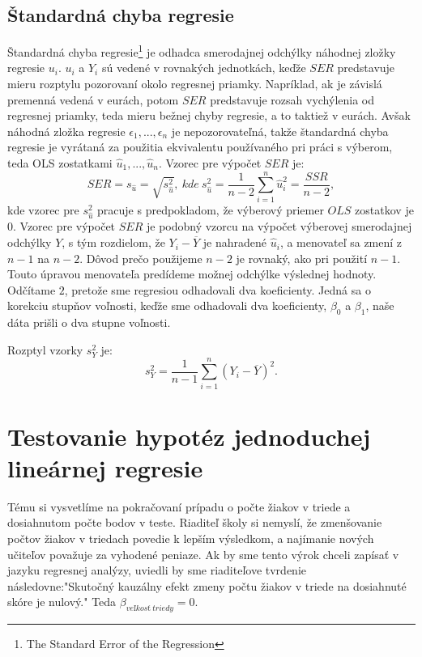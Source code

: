 \documentclass[]{tukediphc}
\begin{document}
\subsection{Štandardná chyba regresie}

Štandardná chyba regresie\footnote{The Standard Error of the Regression} je odhadca smerodajnej odchýlky náhodnej zložky regresie $u_i$. $u_i$ a $Y_i$ sú vedené v rovnakých jednotkách, keďže $SER$ predstavuje mieru rozptylu pozorovaní okolo regresnej priamky. Napríklad, ak je závislá premenná vedená v eurách, potom $SER$ predstavuje rozsah vychýlenia od regresnej priamky, teda mieru bežnej chyby regresie, a to taktiež v eurách. Avšak náhodná zložka regresie $\epsilon_1, ..., \epsilon_n$ je nepozorovateľná, takže štandardná chyba regresie je vyrátaná za použitia ekvivalentu používaného pri práci s výberom, teda OLS zostatkami $\hat{u}_{1}, ..., \hat{u}_{n}$. Vzorec pre výpočet $SER$ je:
\begin{equation}
    SER = s_{\hat{u}} = \sqrt{s_{\hat{u}}^2}, \ kde \ s_{\hat{u}}^2 = \frac{1}{n-2}\sum_{i=1}^{n}\hat{u}_{i}^2 = \frac{SSR}{n-2},
\end{equation}
kde vzorec pre $s_{\hat{u}}^2$ pracuje s predpokladom, že výberový priemer $OLS$ zostatkov je $0$. Vzorec pre výpočet $SER$ je podobný vzorcu na výpočet výberovej smerodajnej odchýlky $Y$, s tým rozdielom, že $Y_i - \overline{Y}$ je nahradené $\hat{u}_{i}$, a menovateľ sa zmení z $n - 1$ na $n - 2$. Dôvod prečo použijeme $n - 2$ je rovnaký, ako pri použití $n - 1$. Touto úpravou menovateľa predídeme možnej odchýlke výslednej hodnoty. Odčítame $2$, pretože sme regresiou odhadovali dva koeficienty. Jedná sa o korekciu stupňov voľnosti, keďže sme odhadovali dva koeficienty, $\beta_0$  a $\beta_1$, naše dáta prišli o dva stupne voľnosti.  

Rozptyl vzorky $s^2_{Y}$ je:
\begin{equation}
    s^2_{Y} = \frac{1}{n - 1}\sum_{i=1}^{n}(Y_i - \overline{Y})^2.
\end{equation}

\newpage
\section{Testovanie hypotéz jednoduchej lineárnej regresie}

Tému si vysvetlíme na pokračovaní prípadu o počte žiakov v triede a dosiahnutom počte bodov v teste. Riaditeľ školy si nemyslí, že zmenšovanie počtov žiakov v triedach povedie k lepším výsledkom, a najímanie nových učiteľov považuje za vyhodené peniaze. Ak by sme tento výrok chceli zapísať v jazyku regresnej analýzy, uviedli by sme riaditeľove tvrdenie následovne:"Skutočný kauzálny efekt zmeny počtu žiakov v triede na dosiahnuté skóre je nulový." Teda $\beta_{veľkosť \ triedy} = 0$. 
\end{document}
